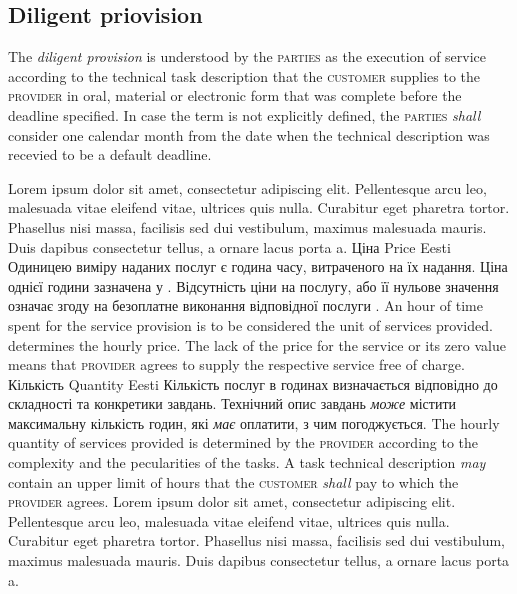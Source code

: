 \begin{Form}
\begin{paracol}{3}
{        \subsection{Diligent priovision}
        The \emph{diligent provision} is understood by the \textsc{parties} as the execution of service according to the technical task description that the \textsc{customer} supplies to the \textsc{provider} in oral, material or electronic form that was complete before the deadline specified. In case the term is not explicitly defined, the \textsc{parties} \emph{shall} consider one calendar month from the date when the technical description was recevied to be a default deadline.
        }
        {Lorem ipsum dolor sit amet, consectetur adipiscing elit. Pellentesque arcu leo, malesuada vitae eleifend vitae, ultrices quis nulla. Curabitur eget pharetra tortor. Phasellus nisi massa, facilisis sed dui vestibulum, maximus malesuada mauris. Duis dapibus consectetur tellus, a ornare lacus porta a.}
      \clase
        {Ціна}
        {Price}
        {Eesti}
        {Одиницею виміру наданих послуг є година часу, витраченого на їх надання. Ціна однієї години зазначена у . Відсутність ціни на послугу, або її нульове значення означає згоду на безоплатне виконання відповідної послуги .}
        {An hour of time spent for the service provision is to be considered the unit of services provided.  determines the hourly price. The lack of the price for the service or its zero value means that \textsc{provider} agrees to supply the respective service free of charge.}
        {}
      \clause
        {Кількість}
        {Quantity}
        {Eesti}
        {Кількість послуг в годинах визначається  відповідно до складності та конкретики завдань. Технічний опис завдань \emph{може} містити максимальну кількість годин, які  \emph{має} оплатити, з чим  погоджується.}
        {The hourly quantity of services provided is determined by the \textsc{provider} according to the complexity and the pecularities of the tasks. A task technical description \emph{may} contain an upper limit of hours that the \textsc{customer} \emph{shall} pay to which the \textsc{provider} agrees.}
        {Lorem ipsum dolor sit amet, consectetur adipiscing elit. Pellentesque arcu leo, malesuada vitae eleifend vitae, ultrices quis nulla. Curabitur eget pharetra tortor. Phasellus nisi massa, facilisis sed dui vestibulum, maximus malesuada mauris. Duis dapibus consectetur tellus, a ornare lacus porta a.}

\end{paracol}
\end{Form}
